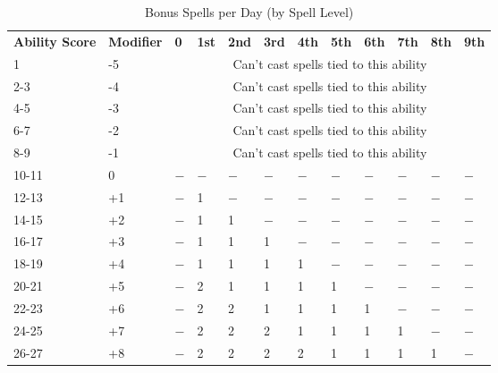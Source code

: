 \begin{table*}[]
\sffamily
\caption{Bonus Spells per Day (by Spell Level)}
\begin{tabular}{llllllllllll}
\textbf{Ability Score} & \textbf{Modifier} & \textbf{0}                                      & \textbf{1st} & \textbf{2nd} & \textbf{3rd} & \textbf{4th} & \textbf{5th} & \textbf{6th} & \textbf{7th} & \textbf{8th} & \textbf{9th} \\
1             & -5       & \multicolumn{10}{c}{Can't cast spells tied to this ability}\\
2-3           & -4       & \multicolumn{10}{c}{Can't cast spells tied to this ability}\\
4-5           & -3       & \multicolumn{10}{c}{Can't cast spells tied to this ability}\\
6-7           & -2       & \multicolumn{10}{c}{Can't cast spells tied to this ability}\\
8-9           & -1       & \multicolumn{10}{c}{Can't cast spells tied to this ability}\\
10-11         & 0        & $-$                                      & $-$   & $-$   & $-$   & $-$   & $-$   & $-$   & $-$   & $-$   & $-$   \\
12-13         & +1       & $-$                                      & 1   & $-$   & $-$   & $-$   & $-$   & $-$   & $-$   & $-$   & $-$   \\
14-15         & +2       & $-$                                      & 1   & 1   & $-$   & $-$   & $-$   & $-$   & $-$   & $-$   & $-$   \\
16-17         & +3       & $-$                                      & 1   & 1   & 1   & $-$   & $-$   & $-$   & $-$   & $-$   & $-$   \\
18-19         & +4       & $-$                                      & 1   & 1   & 1   & 1   & $-$   & $-$   & $-$   & $-$   & $-$   \\
20-21         & +5       & $-$                                      & 2   & 1   & 1   & 1   & 1   & $-$   & $-$   & $-$   & $-$   \\
22-23         & +6       & $-$                                      & 2   & 2   & 1   & 1   & 1   & 1   & $-$   & $-$   & $-$   \\
24-25         & +7       & $-$                                      & 2   & 2   & 2   & 1   & 1   & 1   & 1   & $-$   & $-$   \\
26-27         & +8       & $-$                                      & 2   & 2   & 2   & 2   & 1   & 1   & 1   & 1   & $-$   \\

\end{tabular}
\end{table*}
